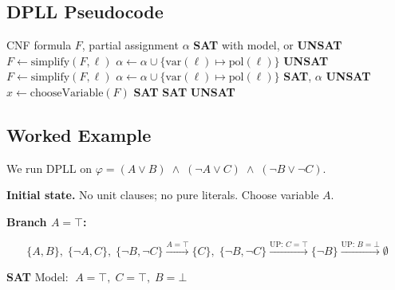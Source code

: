 \documentclass[11pt, a4paper]{article}
\begin{document}
\subsection{DPLL Pseudocode}
\begin{algorithm}[H]
\caption{DPLL($F$, $\alpha$) — Decide satisfiability of CNF formula $F$}
\begin{algorithmic}[1]
\Require CNF formula $F$, partial assignment $\alpha$
\Ensure \textbf{SAT} with model, or \textbf{UNSAT}
\Statex
{}
  \State $F \gets \mathrm{simplify}(F, \ell)$
  \State $\alpha \gets \alpha \cup \{\mathrm{var}(\ell) \mapsto \mathrm{pol}(\ell)\}$
    \Return \textbf{UNSAT}
  \EndIf
\EndWhile
\Statex
{}
  \State $F \gets \mathrm{simplify}(F, \ell)$
  \State $\alpha \gets \alpha \cup \{\mathrm{var}(\ell) \mapsto \mathrm{pol}(\ell)\}$
\EndFor
\Statex
{}
  \Return \textbf{SAT}, $\alpha$
\EndIf
{}
  \Return \textbf{UNSAT}
\EndIf
\Statex
{}
\State $x \gets \mathrm{chooseVariable}(F)$
  \Return \textbf{SAT}
\EndIf
{}
  \Return \textbf{SAT}
\EndIf
\Return \textbf{UNSAT}
\end{algorithmic}
\end{algorithm}
\subsection{Worked Example}

We run DPLL on $\varphi = (A \lor B)\;\land\;(\lnot A \lor C)\;\land\;(\lnot B \lor \lnot C)$.

\medskip
\noindent\textbf{Initial state.}
No unit clauses; no pure literals.
Choose variable $A$.

\medskip
\noindent\textbf{Branch $A = \top$:}

\[
  \{A,B\},\;\{\lnot A, C\},\;\{\lnot B,\lnot C\}
  \xrightarrow{A=\top}
  \{C\},\;\{\lnot B,\lnot C\}
  \xrightarrow{\text{UP: }C=\top}
  \{\lnot B\}
  \xrightarrow{\text{UP: }B=\bot}
  \emptyset
\]

\begin{tcolorbox}[greenstyle]
\textbf{SAT} \quad Model: $\;A = \top,\; C = \top,\; B = \bot$
\end{tcolorbox}
\end{document}
